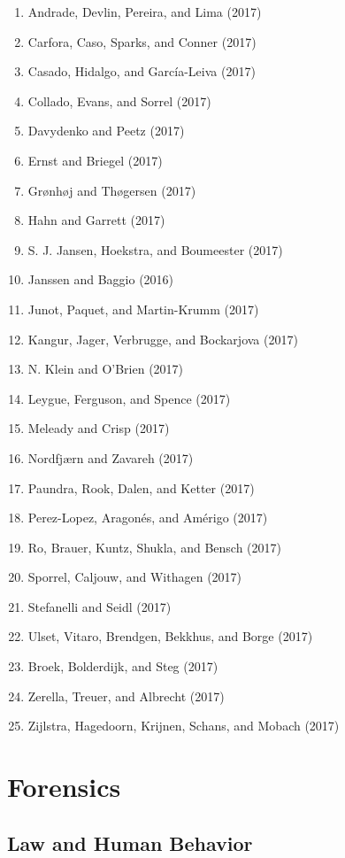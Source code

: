 \documentclass[english,man]{apa6}
\providecommand{\tightlist}{%
  \setlength{\itemsep}{0pt}\setlength{\parskip}{0pt}}
\theoremstyle{definition}
\theoremstyle{definition}
\theoremstyle{definition}
\theoremstyle{remark}
\begin{document}
\begin{enumerate}
\def\labelenumi{\arabic{enumi})}
\tightlist
\item
  Andrade, Devlin, Pereira, and Lima (2017)
\item
  Carfora, Caso, Sparks, and Conner (2017)
\item
  Casado, Hidalgo, and García-Leiva (2017)
\item
  Collado, Evans, and Sorrel (2017)
\item
  Davydenko and Peetz (2017)
\item
  Ernst and Briegel (2017)
\item
  Grønhøj and Thøgersen (2017)
\item
  Hahn and Garrett (2017)
\item
  S. J. Jansen, Hoekstra, and Boumeester (2017)
\item
  Janssen and Baggio (2016)
\item
  Junot, Paquet, and Martin-Krumm (2017)
\item
  Kangur, Jager, Verbrugge, and Bockarjova (2017)
\item
  N. Klein and O'Brien (2017)
\item
  Leygue, Ferguson, and Spence (2017)
\item
  Meleady and Crisp (2017)
\item
  Nordfjærn and Zavareh (2017)
\item
  Paundra, Rook, Dalen, and Ketter (2017)
\item
  Perez-Lopez, Aragonés, and Amérigo (2017)
\item
  Ro, Brauer, Kuntz, Shukla, and Bensch (2017)
\item
  Sporrel, Caljouw, and Withagen (2017)
\item
  Stefanelli and Seidl (2017)
\item
  Ulset, Vitaro, Brendgen, Bekkhus, and Borge (2017)
\item
  Broek, Bolderdijk, and Steg (2017)
\item
  Zerella, Treuer, and Albrecht (2017)
\item
  Zijlstra, Hagedoorn, Krijnen, Schans, and Mobach (2017)
\end{enumerate}

\section{Forensics}\label{forensics}

\subsection{Law and Human Behavior}\label{law-and-human-behavior}
\end{document}
